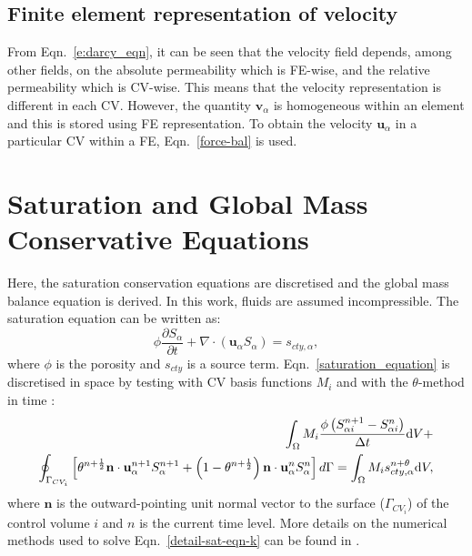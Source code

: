 \subsection{Finite element representation of velocity}\label{ChapterMultiFluidsModel:Section:Force_density}
From Eqn.~\ref{e:darcy_eqn}, it can be seen that the velocity field depends, among other fields, on the absolute permeability which is FE-wise, and the relative permeability which is CV-wise. This means that the velocity representation is different in each CV. However, the quantity $\mathbf{v}_\alpha$ is homogeneous within an element and this is stored using FE representation. To obtain the velocity $\mathbf{u}_{\alpha}$ in a particular CV within a FE, Eqn.~\ref{force-bal} is used.


\section{Saturation and Global Mass Conservative Equations} \label{ChapterMultiFluidsModel:Section:Saturation_Global}
Here, the saturation conservation equations are discretised and the global mass balance equation is derived. In this work, fluids are assumed incompressible. The saturation equation can be written as:
\begin{equation}
  \phi\displaystyle\frac{\partial S_{\alpha} }{\partial t} + \nabla \cdot \left( {\mathbf u}_{\alpha} S_{\alpha}\right) = s_{cty,\alpha}, \label{saturation_equation}
\end{equation}
where $\phi$ is the porosity and $s_{cty}$ is a source term. Eqn.~\ref{saturation_equation} is discretised in space by testing with CV basis functions $M_{i}$ and with the $\theta$-method in time \citep[see][]{gomes_book_2012}:
\begin{eqnarray}
     \int_{\Omega} M_{i} \displaystyle\frac{\phi \left({S_{\alpha i}^{n+1}}-{S_{\alpha i}^{n}}\right)}{\Delta t} \mathrm{d} V + \nonumber  \\ 
     \oint_{\Gamma_{CV_{i}}} \left[\theta^{n+\frac{1}{2}} {\mathbf n}  \cdot {\mathbf u}_{\alpha}^{n+1} S_{\alpha}^{n+1} + \left(1-\theta^{n+\frac{1}{2}}\right) {\mathbf n} \cdot {\mathbf u}_{\alpha}^{n} S_{\alpha}^{n} \right]d\Gamma = \int_{\Omega}  M_{i} {s_{cty,\alpha}^{n+\theta}} \mathrm{d} V, \label{detail-sat-eqn-k}
\end{eqnarray}
where $\mathbf{n}$ is the outward-pointing unit normal vector to the surface ($\Gamma_{CV_{i}}$) of the control volume $i$ and $n$ is the current time level. More details on the numerical methods used to solve Eqn.~\ref{detail-sat-eqn-k} can be found in \cite{pavlidis_2013b}.

